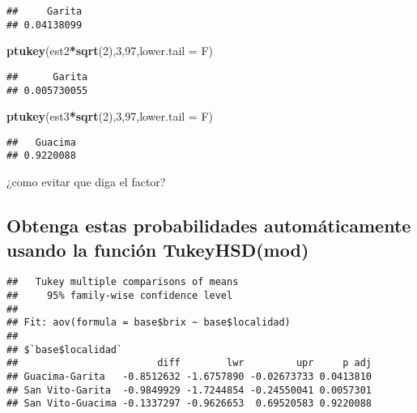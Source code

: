 \documentclass[
]{article}
\newenvironment{Shaded}{\begin{snugshade}}{\end{snugshade}}
\newcommand{\AttributeTok}[1]{\textcolor[rgb]{0.13,0.29,0.53}{#1}}
\newcommand{\DecValTok}[1]{\textcolor[rgb]{0.00,0.00,0.81}{#1}}
\newcommand{\FunctionTok}[1]{\textcolor[rgb]{0.13,0.29,0.53}{\textbf{#1}}}
\newcommand{\NormalTok}[1]{#1}
\newcommand{\OtherTok}[1]{\textcolor[rgb]{0.56,0.35,0.01}{#1}}
\newcommand{\SpecialCharTok}[1]{\textcolor[rgb]{0.81,0.36,0.00}{\textbf{#1}}}
\begin{document}
\begin{verbatim}
##     Garita 
## 0.04138099
\end{verbatim}

\begin{Shaded}
\begin{Highlighting}[]
\FunctionTok{ptukey}\NormalTok{(est2}\SpecialCharTok{*}\FunctionTok{sqrt}\NormalTok{(}\DecValTok{2}\NormalTok{),}\DecValTok{3}\NormalTok{,}\DecValTok{97}\NormalTok{,}\AttributeTok{lower.tail =}\NormalTok{ F)}
\end{Highlighting}
\end{Shaded}

\begin{verbatim}
##      Garita 
## 0.005730055
\end{verbatim}

\begin{Shaded}
\begin{Highlighting}[]
\FunctionTok{ptukey}\NormalTok{(est3}\SpecialCharTok{*}\FunctionTok{sqrt}\NormalTok{(}\DecValTok{2}\NormalTok{),}\DecValTok{3}\NormalTok{,}\DecValTok{97}\NormalTok{,}\AttributeTok{lower.tail =}\NormalTok{ F)}
\end{Highlighting}
\end{Shaded}

\begin{verbatim}
##   Guacima 
## 0.9220088
\end{verbatim}

¿como evitar que diga el factor?

\hypertarget{obtenga-estas-probabilidades-automuxe1ticamente-usando-la-funciuxf3n-tukeyhsdmod}{%
\subsection{Obtenga estas probabilidades automáticamente usando la
función
TukeyHSD(mod)}\label{obtenga-estas-probabilidades-automuxe1ticamente-usando-la-funciuxf3n-tukeyhsdmod}}

\begin{Shaded}
\end{Shaded}

\begin{verbatim}
##   Tukey multiple comparisons of means
##     95% family-wise confidence level
## 
## Fit: aov(formula = base$brix ~ base$localidad)
## 
## $`base$localidad`
##                        diff        lwr         upr     p adj
## Guacima-Garita   -0.8512632 -1.6757890 -0.02673733 0.0413810
## San Vito-Garita  -0.9849929 -1.7244854 -0.24550041 0.0057301
## San Vito-Guacima -0.1337297 -0.9626653  0.69520583 0.9220088
\end{verbatim}
\end{document}
